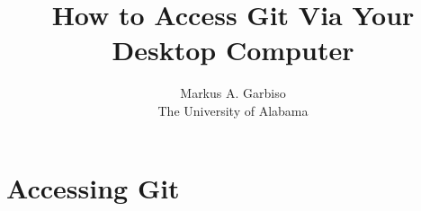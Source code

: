 \documentclass{article}
\title{How to Access Git Via Your Desktop Computer} %
\author{Markus A. Garbiso \\ The University of Alabama} %
\begin{document}
\maketitle

\section{Accessing Git}
\end{document}
